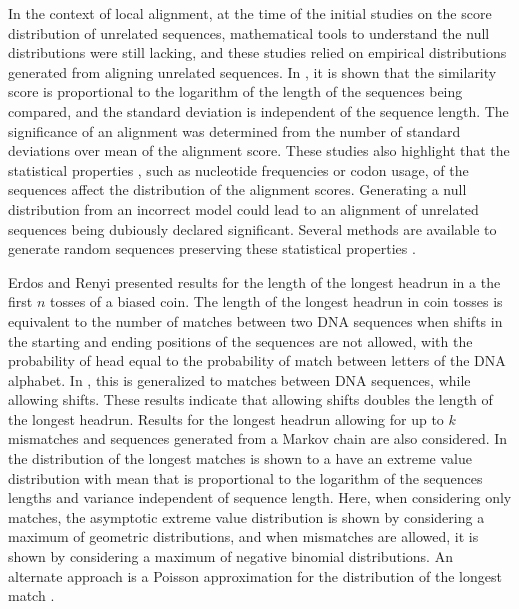 In the context of local alignment, at the time of the initial studies on
the score distribution of unrelated sequences, mathematical tools to
understand the null distributions were still lacking, and these studies
relied on empirical distributions generated from aligning unrelated
sequences.
In \cite{smith1985statistical}, it is shown that the similarity score is
proportional to the logarithm of the length of the sequences being
compared, and the standard deviation is independent of the sequence
length. The significance of an alignment was determined from the number
of standard deviations over mean of the alignment score.
These studies \cite{lipman1984statistical} also highlight that the
statistical properties \cite{smith1983statistical}, such as nucleotide
frequencies or codon usage, of the sequences affect the distribution of
the alignment scores.  Generating a null distribution from an incorrect
model could lead to an alignment of unrelated sequences being dubiously
declared significant. Several methods are available to generate random
sequences preserving these statistical properties
\cite{fitch1983random,altschul1985significance}.

Erdos and Renyi \cite{erdos1975length} presented results for the length
of the longest headrun in a the first $n$ tosses of a biased coin.  The
length of the longest headrun in coin tosses is equivalent to the number
of matches between two DNA sequences when shifts in the starting and
ending positions of the sequences are not allowed, with the probability
of head equal to the probability of match between letters of the DNA
alphabet.
In \cite{arratia1985erdos}, this is generalized to matches between DNA
sequences, while allowing shifts. These results indicate that allowing
shifts doubles the length of the longest headrun. Results for the
longest headrun allowing for up to $k$ mismatches and sequences
generated from a Markov chain are also considered.
In \cite{arratia1986extreme,gordon1986extreme} the distribution of the
longest matches is shown to a have an extreme value distribution with
mean that is proportional to the logarithm of the sequences lengths and
variance independent of sequence length. Here, when considering only
matches, the asymptotic extreme value distribution is shown by
considering a maximum of geometric distributions, and when mismatches
are allowed, it is shown by considering a maximum of negative binomial
distributions.
An alternate approach is a Poisson approximation for the distribution of
the longest match \cite{arratia1989erdos}.

